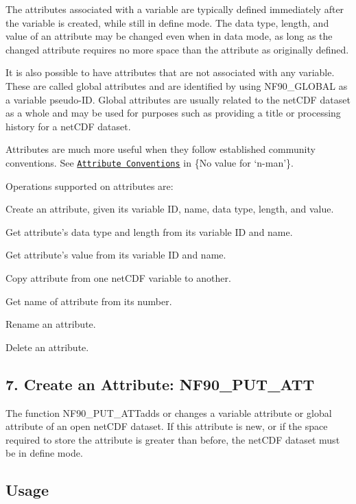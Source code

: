 The attributes associated with a variable are typically defined immediately after the variable is created, while still in define mode. The data type, length, and value of an attribute may be changed even when in data mode, as long as the changed attribute requires no more space than the attribute as originally defined.

It is also possible to have attributes that are not associated with any variable. These are called global attributes and are identified by using N\+F90\+\_\+\+G\+L\+O\+B\+AL as a variable pseudo-\/\+ID. Global attributes are usually related to the net\+C\+DF dataset as a whole and may be used for purposes such as providing a title or processing history for a net\+C\+DF dataset.

Attributes are much more useful when they follow established community conventions. See \href{netcdf.html#Attribute-Conventions}{\tt Attribute Conventions} in \{No value for ‘n-\/man’\}.

Operations supported on attributes are\+:


\begin{DoxyItemize}
\item Create an attribute, given its variable ID, name, data type, length, and value.
\item Get attribute’s data type and length from its variable ID and name.
\item Get attribute’s value from its variable ID and name.
\item Copy attribute from one net\+C\+DF variable to another.
\item Get name of attribute from its number.
\item Rename an attribute.
\item Delete an attribute.
\end{DoxyItemize}\hypertarget{f90-attributes_f90-create-an-attribute-nf90_put_att}{}\subsection{7. Create an Attribute\+: N\+F90\+\_\+\+P\+U\+T\+\_\+\+A\+T\+T }\label{f90-attributes_f90-create-an-attribute-nf90_put_att}
The function N\+F90\+\_\+\+P\+U\+T\+\_\+\+A\+T\+Tadds or changes a variable attribute or global attribute of an open net\+C\+DF dataset. If this attribute is new, or if the space required to store the attribute is greater than before, the net\+C\+DF dataset must be in define mode.

\subsection*{Usage}

